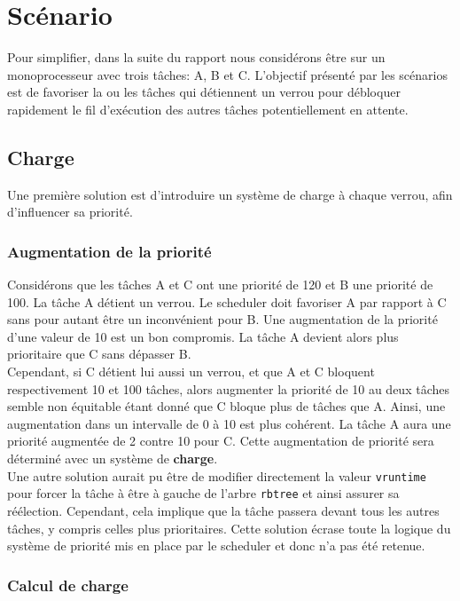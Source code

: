 \section{Scénario}

Pour simplifier, dans la suite du rapport nous considérons être sur un monoprocesseur
avec trois tâches: A, B et C. L'objectif présenté par les scénarios est de favoriser
la ou les tâches qui détiennent un verrou pour débloquer rapidement le fil d'exécution
des autres tâches potentiellement en attente.


\subsection{Charge}

Une première solution est d'introduire un système de charge à chaque verrou, afin
d'influencer sa priorité.

\subsubsection{Augmentation de la priorité}

Considérons que les tâches A et C ont une priorité de 120 et B une priorité de 100.
La tâche A détient un verrou. Le scheduler doit favoriser A par rapport à C sans pour
autant être un inconvénient pour B.
Une augmentation de la priorité d'une valeur de 10 est un bon compromis. La tâche A
devient alors plus prioritaire que C sans dépasser B.
\\

Cependant, si C détient lui aussi un verrou, et que A et C bloquent respectivement 
10 et 100 tâches, alors augmenter la priorité de 10 au deux tâches semble non équitable
étant donné que C bloque plus de tâches que A. Ainsi, une augmentation dans un
intervalle de 0 à 10 est plus cohérent. La tâche A aura une priorité augmentée
de 2 contre 10 pour C. Cette augmentation de priorité sera déterminé
avec un système de \textbf{charge}.
\\

Une autre solution aurait pu être de modifier directement la valeur \verb|vruntime|
pour forcer la tâche à être à gauche de l'arbre \verb|rbtree| et ainsi assurer sa
réélection. Cependant, cela implique que la tâche passera devant tous les autres tâches,
y compris celles plus prioritaires. Cette solution écrase toute la logique du système
de priorité mis en place par le scheduler et donc n'a pas été retenue.


\subsubsection{Calcul de charge}

